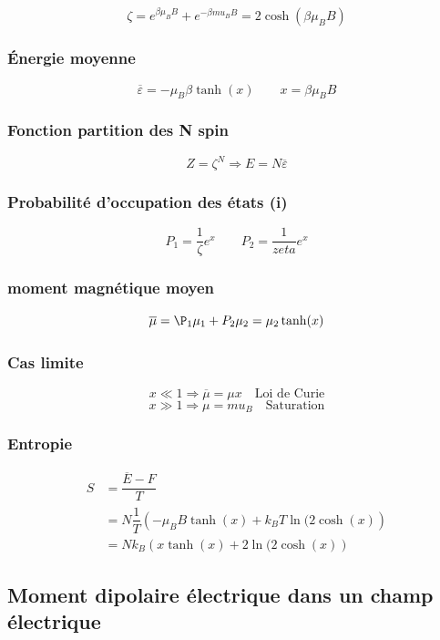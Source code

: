 \documentclass[12pt,a4paper]{report}
\begin{document}
\[
	\zeta = e^{\beta \mu_B B} + e^{-\beta mu_B B} = 2 \cosh(\beta \mu_B B)
\]

\subsubsection{Énergie moyenne}

\[
	\overline{\varepsilon} = -\mu_B \beta \tanh(x) \qquad x = \beta \mu_B B
\]

\subsubsection{ Fonction partition des N spin}

\[
	Z = \zeta^N \Rightarrow E = N \overline{\varepsilon}
\]

\subsubsection{Probabilité d'occupation des états (i)}

\[
	P_1 = \dfrac{1}{\zeta}e^x \qquad P_2 = \dfrac{1}{zeta} e^x
\]

\subsubsection{moment magnétique moyen}

\[
	\overline{\mu} = \P_1 \mu_1 + P_2 \mu_2 = \mu_2 \tanh(x)
\]

\subsubsection{Cas limite}

\[
	x \ll 1 \Rightarrow \overline{\mu} = \mu x \quad \text{Loi de Curie}
\]
\[
	x \gg 1 \Rightarrow \mu = mu_B \quad \text{Saturation}
\]

\subsubsection{Entropie}

\begin{align*}
	S &= \dfrac{\overline{E} - F}{T}\\
	&= N \dfrac{1}{T} \left ( - \mu_B B \tanh (x) + k_B T \ln (2 \cosh(x)\right )\\
	&= N k_B \left ( x \tanh(x) + 2 \ln (2 \cosh(x) \right )
\end{align*}

\subsection{Moment dipolaire électrique dans un champ électrique}
\end{document}
